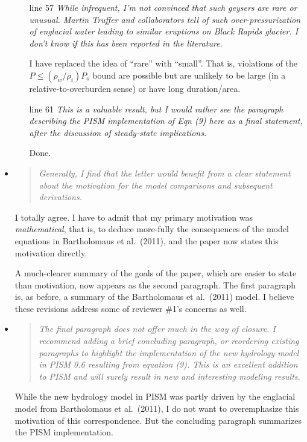 \documentclass[11pt,reqno]{amsart}
\newcommand{\reply}[2]{
\medskip\medskip
\item  \begin{quote}
\emph{#1}
\end{quote}

\medskip
\noindent #2}
\begin{document}
\begin{itemize}
{\begin{itemize}
\item[line 57]  \emph{While infrequent, I'm not convinced that such geysers are rare or unusual.  Martin Truffer and collaborators tell of such over-pressurization of  englacial water leading to similar eruptions on Black Rapids glacier.   I don't know if this has been reported in the literature.}

\quad I have replaced the idea of ``rare'' with ``small''.  That is, violations of the $P\le (\rho_w/\rho_i) P_o$ bound are possible but are unlikely to be large (in a relative-to-overburden sense) or have long duration/area.

\item[line 61]  \emph{This is a valuable result, but I would rather see the paragraph describing the PISM implementation of Eqn (9) here as a final statement, after the discussion of steady-state implications.}

\quad Done.
\end{itemize}}

\reply{Generally, I find that the letter would benefit from a clear statement about the motivation for the model comparisons and subsequent derivations.}
{I totally agree.  I have to admit that my primary motivation was \emph{mathematical}, that is, to deduce more-fully the consequences of the model equations in Bartholomaus et al.~(2011), and the paper now states this motivation directly.

A much-clearer summary of the goals of the paper, which are easier to state than motivation, now appears as the second paragraph.  The first paragraph is, as before, a summary of the Bartholomaus et al.~(2011) model.  I believe these revisions address some of reviewer \#1's concerns as well.}

\reply{The final paragraph does not offer much in the way of closure.  I recommend adding a brief concluding paragraph, or reordering existing paragraphs to highlight the implementation of the new hydrology model in PISM 0.6 resulting from equation (9).  This is an excellent addition to PISM and will surely result in new and interesting modeling results.}
{While the new hydrology model in PISM was partly driven by the englacial model from Bartholomaus et al.~(2011), I do not want to overemphasize this motivation of this correspondence.  But the concluding paragraph summarizes the PISM implementation.}
\end{itemize}
\end{document}
